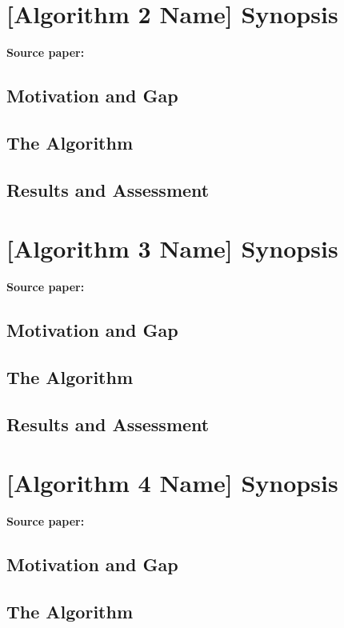 \documentclass[11pt,a4paper]{article}
\begin{document}
\section{[Algorithm 2 Name] Synopsis}
\label{sec:algo2}

\noindent\textbf{Source paper:} 

\subsection*{Motivation and Gap}


\subsection*{The Algorithm}


\subsection*{Results and Assessment}

\section{[Algorithm 3 Name] Synopsis}
\label{sec:algo3}

\noindent\textbf{Source paper:} 
\subsection*{Motivation and Gap}


\subsection*{The Algorithm}


\subsection*{Results and Assessment}


\section{[Algorithm 4 Name] Synopsis}
\label{sec:algo4}

\noindent\textbf{Source paper:} 
\subsection*{Motivation and Gap}

\subsection*{The Algorithm}
\end{document}
